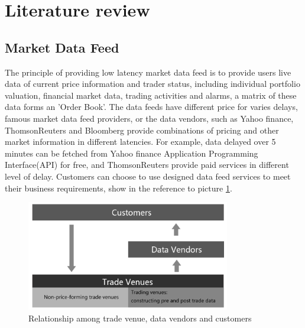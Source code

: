 \documentclass[11pt,openright,a4paper]{report}
\begin{document}
\section{Literature review}
\subsection{Market Data Feed}
The principle of providing low latency market data feed is to provide users live data of current price information and trader status, including individual portfolio valuation, financial market data, trading activities and alarms, a matrix of these data forms an 'Order Book'. The data feeds have different price for varies delays, famous market data feed providers, or the data vendors, such as Yahoo finance, ThomsonReuters and Bloomberg provide combinations of pricing and other market information in different latencies. For example, data delayed over 5 minutes can be fetched from Yahoo finance Application Programming Interface(API) for free\cite{financeyahoo}, and ThomsonReuters provide paid services in different level of delay. Customers can choose to use designed data feed services to meet their business requirements, show in the reference to picture \ref{fig:1}.\\
\begin{figure}[htbp] 
\centering\includegraphics[width=3.5in]{picture/tradevenue.PNG} 
\caption{Relationship among trade venue, data vendors and customers}
\label{fig:1} 
\end{figure} 
\end{document}

